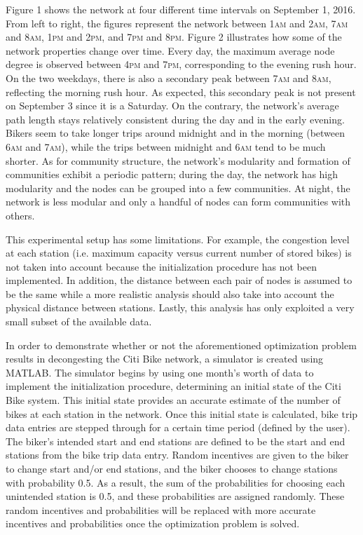 \documentclass[times, 10pt,twocolumn]{article}
\begin{document}
Figure 1 shows the network at four different time intervals on September 1, 2016. From left to right, the figures represent the network between 1\textsc{am} and 2\textsc{am}, 7\textsc{am} and 8\textsc{am}, 1\textsc{pm} and 2\textsc{pm}, and 7\textsc{pm} and 8\textsc{pm}. Figure 2 illustrates how some of the network properties change over time. Every day, the maximum average node degree is observed between 4\textsc{pm} and 7\textsc{pm}, corresponding to the evening rush hour. On the two weekdays, there is also a secondary peak between 7\textsc{am} and 8\textsc{am}, reflecting the morning rush hour. As expected, this secondary peak is not present on September 3 since it is a Saturday. On the contrary, the network's average path length stays relatively consistent during the day and in the early evening. Bikers seem to take longer trips around midnight and in the morning (between 6\textsc{am} and 7\textsc{am}), while the trips between midnight and 6\textsc{am} tend to be much shorter. As for community structure, the network's modularity and formation of communities exhibit a periodic pattern; during the day, the network has high modularity and the nodes can be grouped into a few communities. At night, the network is less modular and only a handful of nodes can form communities with others.

This experimental setup has some limitations. For example, the congestion level at each station (i.e. maximum capacity versus current number of stored bikes) is not taken into account because the initialization procedure has not been implemented. In addition, the distance between each pair of nodes is assumed to be the same while a more realistic analysis should also take into account the physical distance between stations. Lastly, this analysis has only exploited a very small subset of the available data.

In order to demonstrate whether or not the aforementioned optimization problem results in decongesting the Citi Bike network, a simulator is created using MATLAB. The simulator begins by using one month's worth of data to implement the initialization procedure, determining an initial state of the Citi Bike system. This initial state provides an accurate estimate of the number of bikes at each station in the network. Once this initial state is calculated, bike trip data entries are stepped through for a certain time period (defined by the user). The biker's intended start and end stations are defined to be the start and end stations from the bike trip data entry. Random incentives are given to the biker to change start and/or end stations, and the biker chooses to change stations with probability 0.5. As a result, the sum of the probabilities for choosing each unintended station is 0.5, and these probabilities are assigned randomly. These random incentives and probabilities will be replaced with more accurate incentives and probabilities once the optimization problem is solved.
\end{document}
